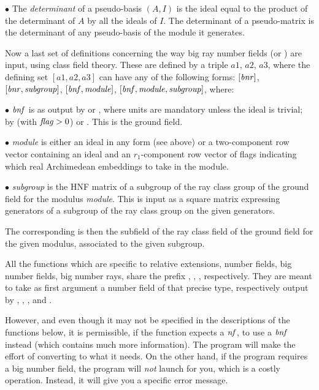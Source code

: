 $\bullet$ The \emph{determinant} of a pseudo-basis $(A,I)$ is the ideal
equal to the product of the determinant of $A$ by all the ideals of $I$. The
determinant of a pseudo-matrix is the determinant of any pseudo-basis of the
module it generates.

Now a last set of definitions concerning the way big ray number fields
(or ) are input, using class field theory.
These are defined by a triple
$a1$, $a2$, $a3$, where the defining set $[a1,a2,a3]$ can have any of the
following forms: $[\hbox{\it bnr\/}]$, $[\hbox{\it bnr\/},\hbox{\it subgroup\/}]$,
$[\hbox{\it bnf\/},\hbox{\it module\/}]$, $[\hbox{\it bnf\/},\hbox{\it module\/},\hbox{\it subgroup\/}]$, where:

$\bullet$ $\hbox{\it bnf\/}$ is as output by  or ,
where units are mandatory unless the ideal is trivial;  by
 (with $\hbox{\it f\kern0pt lag\/}>0$) or . This is the ground field.

$\bullet$ \emph{module} is either an ideal in any form (see above) or a
two-component row vector containing an ideal and an $r_1$-component row
vector of flags indicating which real Archimedean embeddings to take in the
module.

$\bullet$ \emph{subgroup} is the HNF matrix of a subgroup of the ray class group
of the ground field for the modulus \emph{module}. This is input as a square
matrix expressing generators of a subgroup of the ray class group
 on the given generators.

The corresponding  is then the subfield of the ray class field of the
ground field for the given modulus, associated to the given subgroup.

All the functions which are specific to relative extensions, number fields,
big number fields, big number rays, share the prefix , ,
,  respectively. They are meant to take as first argument a
number field of that precise type, respectively output by ,
, , and .

However, and even though it may not be specified in the descriptions of the
functions below, it is permissible, if the function expects a $\hbox{\it nf\/}$, to
use a $\hbox{\it bnf\/}$ instead (which contains much more information). The program
will make the effort of converting to what it needs. On the other hand, if
the program requires a big number field, the program will \emph{not} launch
 for you, which is a costly operation. Instead, it will give you
a specific error message.

